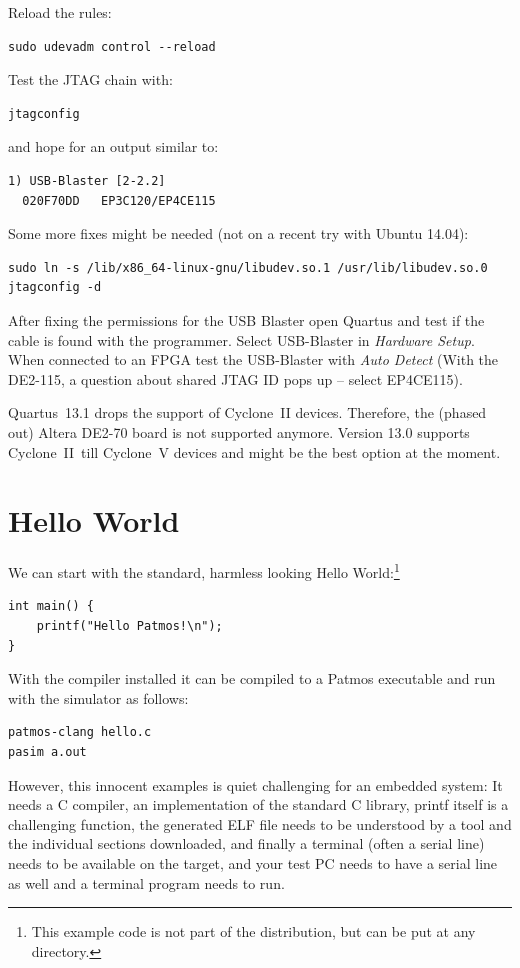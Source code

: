 \documentclass[a4paper,fontsize=10pt,twoside,DIV15,BCOR12mm,headinclude=true,footinclude=false,pagesize,bibtotoc]{scrbook}
\begin{document}
Reload the rules:
\begin{verbatim}
sudo udevadm control --reload
\end{verbatim}

Test the JTAG chain with:
\begin{verbatim}
jtagconfig
\end{verbatim}

and hope for an output similar to:

\begin{verbatim}
1) USB-Blaster [2-2.2]
  020F70DD   EP3C120/EP4CE115
\end{verbatim}

Some more fixes might be needed (not on a recent try with Ubuntu 14.04):

\begin{verbatim}
sudo ln -s /lib/x86_64-linux-gnu/libudev.so.1 /usr/lib/libudev.so.0
jtagconfig -d
\end{verbatim}


After fixing the permissions for the USB Blaster open Quartus and test if the
cable is found with the programmer. Select USB-Blaster in \emph{Hardware Setup}.
When connected to an FPGA test the USB-Blaster with \emph{Auto Detect}
(With the DE2-115, a question about shared JTAG ID pops up -- select EP4CE115).

Quartus~13.1 drops the support of Cyclone~II devices. Therefore, the
(phased out) Altera DE2-70 board is not supported anymore. Version 13.0 supports Cyclone~II\
till Cyclone~V devices and might be the best option at the moment.


\section{Hello World}

We can start with the standard, harmless looking Hello
World:\footnote{This example code is not part of the distribution, but
can be put at any directory.}
\begin{lstlisting}
int main() {
    printf("Hello Patmos!\n");
}
\end{lstlisting}

With the compiler installed it can be compiled to a Patmos executable
and run with the simulator as follows:

\begin{verbatim}
patmos-clang hello.c
pasim a.out
\end{verbatim}

However, this innocent examples is quiet challenging for an embedded system:
It needs a C compiler, an implementation of the standard C library, printf
itself is a challenging function, the generated ELF file needs to be understood
by a tool and the individual sections downloaded, and finally a terminal (often
a serial line) needs to be available on the target, and your test PC needs to
have a serial line as well and a terminal program needs to run.
\end{document}
